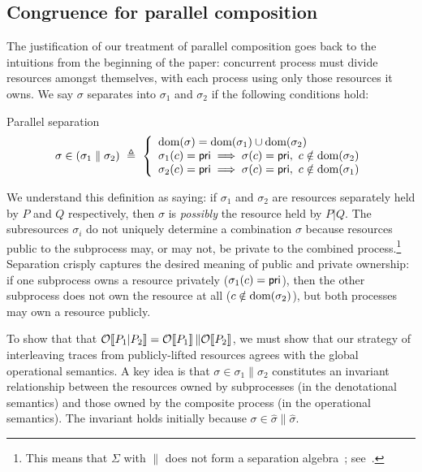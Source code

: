 \documentclass{entcs}
\begin{document}
\subsection{Congruence for parallel composition}

The justification of our treatment of parallel composition goes back
to the intuitions from the beginning of the paper: concurrent process
must divide resources amongst themselves, with each process using only
those resources it owns.  We say $\sigma$ separates into $\sigma_1$
and $\sigma_2$ if the following conditions hold:
\begin{display}{Parallel separation}
\[
  \sigma \in (\sigma_1 \parallel \sigma_2) \ \triangleq\
  \left\{
  \begin{array}{l}
\textrm{dom}(\sigma) = \textrm{dom}(\sigma_1) \cup \textrm{dom}(\sigma_2) \\
\sigma_1(c) = \textsf{pri} \implies \sigma(c)=\textsf{pri},\ c\notin\textrm{dom}(\sigma_2) \\
    \sigma_2(c) = \textsf{pri} \implies \sigma(c)=\textsf{pri},\ c\notin\textrm{dom}(\sigma_1) 
  \end{array}
  \right.
\]
\end{display}


We understand this definition as saying: if $\sigma_1$ and $\sigma_2$
are resources separately held by $P$ and $Q$ respectively, then
$\sigma$ is \emph{possibly} the resource held by $P|Q$.  The
subresources $\sigma_i$ do not uniquely determine a combination
$\sigma$ because resources public to the subprocess may, or may not,
be private to the combined process.\footnote{
  This means that $\Sigma$ with $\parallel$ does not form a separation 
  algebra~\cite{Calcagno2007}; see~\secref{resources}.
}
Separation crisply captures the desired meaning of public and private
ownership: if one subprocess owns a resource privately ($\sigma_1(c) =
\textsf{pri}$), then the other subprocess does not own the resource at all ($c
\notin\textrm{dom}(\sigma_2)$), but both processes may own a resource
publicly.




To show that that $\mathcal{O}\!\left\llbracket P_1|P_2 \right\rrbracket = \mathcal{O}\!\left\llbracket P_1 \right\rrbracket \mbox{$\parallel$}
\mathcal{O}\!\left\llbracket P_2 \right\rrbracket$, we must show that our strategy of interleaving traces from
publicly-lifted resources agrees with the global operational
semantics.  A key idea is that $\sigma \in \sigma_1 \parallel
\sigma_2$ constitutes an invariant relationship between the resources
owned by subprocesses (in the denotational semantics) and those owned
by the composite process (in the operational semantics).  The
invariant holds initially because $\sigma \in \widehat{\sigma}
\parallel \widehat{\sigma}$.
\end{document}
